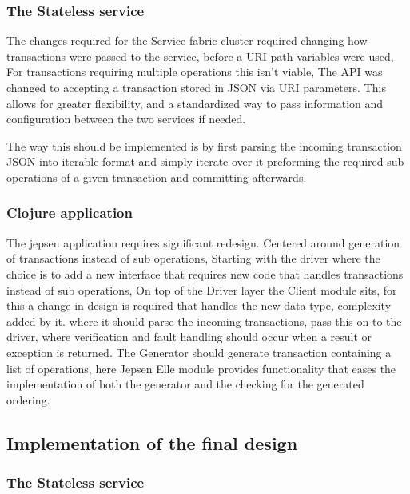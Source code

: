 \documentclass[a4paper,10pt,titlepage]{report}
\begin{document}
    
    \subsubsection{The Stateless service}
    
    The changes required for the Service fabric cluster required changing how transactions were passed to the service, before a URI path variables were used, For transactions requiring multiple operations this isn't viable, The API was changed to accepting a transaction stored in JSON via URI parameters. This allows for greater flexibility, and a standardized way to pass information and configuration between the two services if needed. 
    
    The way this should be implemented is by first parsing the incoming transaction JSON into iterable format and simply iterate over it preforming the required sub operations of a given transaction and committing afterwards.
    
    \subsubsection{Clojure application}
    
    The jepsen application requires significant redesign. Centered around generation of transactions instead of sub operations, Starting with the driver where the choice is to add a new interface that requires new code that handles transactions instead of sub operations, On top of the Driver layer the Client module sits, for this a change in design is required that handles the new data type, complexity added by it. where it should parse the incoming transactions, pass this on to the driver, where verification and fault handling should occur when a result or exception is returned. The Generator should generate transaction containing a list of operations, here Jepsen Elle module provides functionality that eases the implementation of both the generator and the checking for the generated ordering.
    
    \subsection{Implementation of the final design}
    
    \subsubsection{The Stateless service}
    
\end{document}
